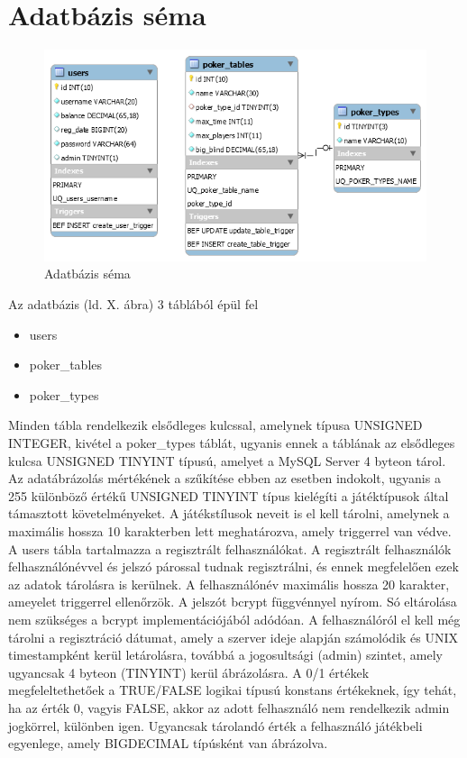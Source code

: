 \section{Adatbázis séma}
\begin{figure}[h!]
  \caption{Adatbázis séma}
  \centering
    \includegraphics[width=\textwidth]{user-documentation/images/db_scheme.png}
\end{figure}
Az adatbázis (ld. X. ábra) 3 táblából épül fel
\begin{itemize}[leftmargin=2.7cm]
\item users
\item poker\_tables
\item poker\_types
\end{itemize}
 Minden tábla rendelkezik elsődleges kulcssal, amelynek típusa UNSIGNED INTEGER, kivétel a poker\_types táblát, ugyanis ennek a táblának az elsődleges kulcsa UNSIGNED TINYINT típusú, amelyet a MySQL Server 4 byteon tárol. Az adatábrázolás mértékének a szűkítése ebben az esetben indokolt, ugyanis a 255 különböző értékű UNSIGNED TINYINT típus kielégíti a játéktípusok által támasztott követelményeket. A játékstílusok neveit is el kell tárolni, amelynek a maximális hossza 10 karakterben lett meghatározva, amely triggerrel van védve. A users tábla tartalmazza a regisztrált felhasználókat. A regisztrált felhasználók felhasználónévvel és jelszó párossal tudnak regisztrálni, és ennek megfelelően ezek az adatok tárolásra is kerülnek. A felhasználónév maximális hossza 20 karakter, ameyelet triggerrel ellenőrzök. A jelszót bcrypt függvénnyel nyírom. Só eltárolása nem szükséges a bcrypt implementációjából adódóan. A felhasználóról el kell még tárolni a regisztráció dátumat, amely a szerver ideje alapján számolódik és UNIX timestampként kerül letárolásra, továbbá a jogosultsági (admin) szintet, amely ugyancsak 4 byteon (TINYINT) kerül ábrázolásra. A 0/1 értékek megfeleltethetőek a TRUE/FALSE logikai típusú konstans értékeknek, így tehát, ha az érték 0, vagyis FALSE, akkor az adott felhasználó nem rendelkezik admin jogkörrel, különben igen. Ugyancsak tárolandó érték a felhasználó játékbeli egyenlege, amely BIGDECIMAL típúsként van ábrázolva.

